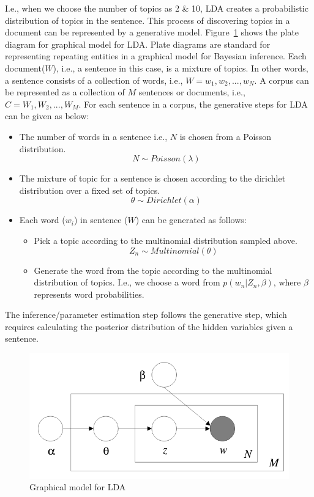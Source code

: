 I.e., when we choose the number of topics as 2 \& 10, LDA creates a probabilistic distribution of topics in the sentence. This process of discovering topics in a document can be represented by a generative model. Figure~\ref{fig:ldaplate} shows the plate diagram for graphical model for LDA. Plate diagrams are standard for representing repeating entities in a graphical model for Bayesian inference. Each document($W$), i.e., a sentence in this case, is a mixture of topics. In other words, a sentence consists of a collection of words, i.e., $W = {w_1,w_2, ..., w_N}$. A corpus can be represented as a collection of $M$ sentences or documents, i.e., $C = {W_1, W_2, ..., W_M}$. For each sentence in a corpus, the generative steps for LDA can be given as below:
\begin{itemize}
    \item The number of words in a sentence i.e., $N$ is chosen from a Poisson distribution.
    $$N \sim Poisson(\lambda)$$
    \item The mixture of topic for a sentence is chosen according to the dirichlet distribution over a fixed set of topics.
    $$\theta \sim Dirichlet(\alpha)$$
    \item Each word ($w_i$) in sentence ($W$) can be generated as follows:
    \begin{itemize}
        \item Pick a topic according to the multinomial distribution sampled above.
        $$Z_n \sim Multinomial(\theta)$$
        \item Generate the word from the topic according to the multinomial distribution of topics. I.e., we choose a word from $p(w_n|Z_n, \beta)$, where $\beta$ represents word probabilities.
    \end{itemize}
    
    
\end{itemize}

The inference/parameter estimation step follows the generative step, which requires calculating the posterior distribution of the hidden variables given a sentence. 



\begin{figure}[t]
    \centering
    \includegraphics[width=\textwidth]{figures/LDA_plate_diagram.png}
 \caption{Graphical model for LDA~\citep{Blei:2003:LDA:944919.944937}}\label{fig:ldaplate}   
 \end{figure}
 

